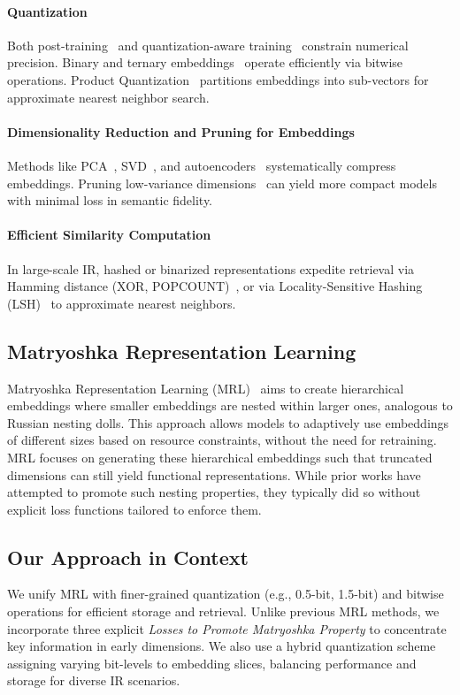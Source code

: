 \paragraph{Quantization}
Both post-training~\cite{jacob2018quantization} and quantization-aware training~\cite{hubara2017quantized,mishra2018apprentice} constrain numerical precision. Binary and ternary embeddings~\cite{shen2018nash, shu2018compressing} operate efficiently via bitwise operations. Product Quantization~\cite{jegou2010product} partitions embeddings into sub-vectors for approximate nearest neighbor search.

\paragraph{Dimensionality Reduction and Pruning for Embeddings}
Methods like PCA~\cite{jolliffe2016principal}, SVD~\cite{golub1971singular}, and autoencoders~\cite{hinton2006reducing} systematically compress embeddings. Pruning low-variance dimensions~\cite{li2016pruning} can yield more compact models with minimal loss in semantic fidelity.

\paragraph{Efficient Similarity Computation}
In large-scale IR, hashed or binarized representations expedite retrieval via Hamming distance (XOR, POPCOUNT)~\cite{wang2017survey}, or via Locality-Sensitive Hashing (LSH)~\cite{andoni2006near} to approximate nearest neighbors.

\subsection{Matryoshka Representation Learning}
Matryoshka Representation Learning (MRL)~\cite{kusupati2021matryoshka} aims to create hierarchical embeddings where smaller embeddings are nested within larger ones, analogous to Russian nesting dolls. This approach allows models to adaptively use embeddings of different sizes based on resource constraints, without the need for retraining. MRL focuses on generating these hierarchical embeddings such that truncated dimensions can still yield functional representations. While prior works have attempted to promote such nesting properties, they typically did so without explicit loss functions tailored to enforce them.

\subsection{Our Approach in Context}
We unify MRL with finer-grained quantization (e.g., 0.5-bit, 1.5-bit) and bitwise operations for efficient storage and retrieval. Unlike previous MRL methods, we incorporate three explicit \emph{Losses to Promote Matryoshka Property} to concentrate key information in early dimensions. We also use a hybrid quantization scheme assigning varying bit-levels to embedding slices, balancing performance and storage for diverse IR scenarios.
